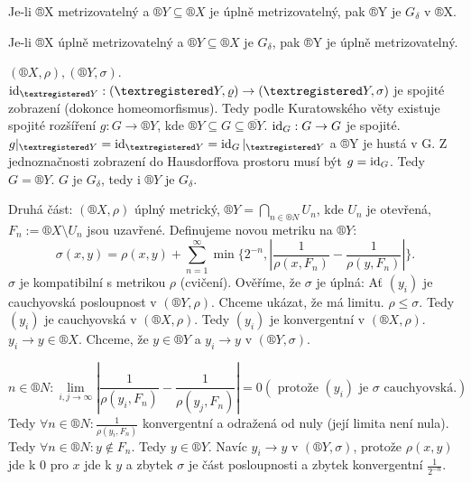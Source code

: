 \documentclass[12pt]{article}					%
\begin{document}
    \begin{veta}[Alexandrov]
        Je-li ®X metrizovatelný a $®Y \subseteq ®X$ je úplně metrizovatelný, pak ®Y je $G_\delta$ v ®X.

        Je-li ®X úplně metrizovatelný a $®Y \subseteq ®X$ je $G_{\delta}$, pak ®Y je úplně metrizovatelný.

        \begin{dukazin}
            $(®X, \rho), (®Y, \sigma)$. $\id_{®Y}: (®Y, \rho) \rightarrow (®Y, \sigma)$ je spojité zobrazení (dokonce homeomorfismus). Tedy podle Kuratowského věty existuje spojité rozšíření $g: G \rightarrow ®Y$, kde $®Y \subseteq G \subseteq \overline{®Y}$. $\operatorname{id}_G: G \rightarrow G$ je spojité. $g|_{®Y} = \id_{®Y} = \id_G|_{®Y}$ a ®Y je hustá v G. Z jednoznačnosti zobrazení do Hausdorffova prostoru musí být $g = \operatorname{id}_G$. Tedy $G = ®Y$. $G$ je $G_{\delta}$, tedy i $®Y$ je $G_{\delta}$.

            Druhá část: $(®X, \rho)$ úplný metrický, $®Y = \bigcap_{n \in ®N}U_n$, kde $U_n$ je otevřená, $F_n := ®X \setminus U_n$ jsou uzavřené. Definujeme novou metriku na $®Y$:
            $$ \sigma(x, y) = \rho(x, y) + \sum_{n=1}^∞ \min\{2^{-n}, \left|\frac{1}{\rho(x, F_n)} - \frac{1}{\rho(y, F_n)}\right|\}. $$
            $\sigma$ je kompatibilní s metrikou $\rho$ (cvičení). Ověříme, že $\sigma$ je úplná: Ať $(y_i)$ je cauchyovská posloupnost v $(®Y, \rho)$. Chceme ukázat, že má limitu. $\rho ≤ \sigma$. Tedy $(y_i)$ je cauchyovská v $(®X, \rho)$. Tedy $(y_i)$ je konvergentní v $(®X, \rho)$. $y_i \rightarrow y \in ®X$. Chceme, že $y \in ®Y$ a $y_i \rightarrow y$ v $(®Y, \sigma)$.

            $$ n \in ®N: \lim_{i, j \rightarrow ∞}\left| \frac{1}{\rho(y_i, F_n)} - \frac{1}{\rho(y_j, F_n)} \right| = 0 (\text{ protože $(y_i)$ je $\sigma$ cauchyovská.}) $$ 
            Tedy $\forall n \in ®N: \frac{1}{\rho(y_i, F_n)}$ konvergentní a odražená od nuly (její limita není nula). Tedy $\forall n \in ®N: y \notin F_n$. Tedy $y \in ®Y$. Navíc $y_i \rightarrow y$ v $(®Y, \sigma)$, protože $\rho (x, y)$ jde k 0 pro $x$ jde k $y$ a zbytek $\sigma$ je část posloupnosti a zbytek konvergentní $\frac{1}{2^{-n}}$.
        \end{dukazin}
    \end{veta}
\end{document}
